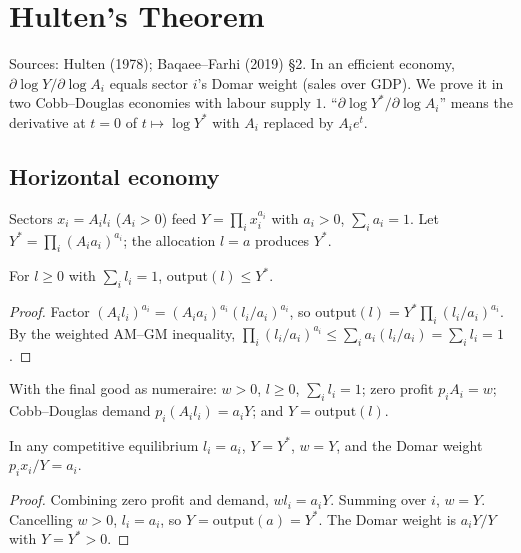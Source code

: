 \chapter{Hulten's Theorem}
\label{chap:hulten}

Sources: Hulten (1978); Baqaee--Farhi (2019) \S2. In an efficient economy,
$\partial \log Y / \partial \log A_i$ equals sector $i$'s Domar weight (sales over GDP). We prove it in two
Cobb--Douglas economies with labour supply $1$. ``$\partial \log Y^*/\partial \log A_i$'' means the derivative
at $t = 0$ of $t \mapsto \log Y^*$ with $A_i$ replaced by $A_i e^t$.

\section{Horizontal economy}
\label{sec:hulten_horizontal}

\begin{definition}
\label{def:hulten_horizontal}
\leanok
Sectors $x_i = A_i l_i$ ($A_i > 0$) feed $Y = \prod_i x_i^{a_i}$ with $a_i > 0$, $\sum_i a_i = 1$. Let
$Y^* = \prod_i (A_i a_i)^{a_i}$; the allocation $l = a$ produces $Y^*$.
\end{definition}

\begin{theorem}
\label{thm:hulten_h_output_le}
\leanok
{}
For $l \ge 0$ with $\sum_i l_i = 1$, $\mathrm{output}(l) \le Y^*$.
\end{theorem}
\begin{proof}
\leanok
Factor $(A_i l_i)^{a_i} = (A_i a_i)^{a_i} (l_i/a_i)^{a_i}$, so $\mathrm{output}(l) = Y^* \prod_i (l_i/a_i)^{a_i}$.
By the weighted AM--GM inequality, $\prod_i (l_i/a_i)^{a_i} \le \sum_i a_i (l_i/a_i) = \sum_i l_i = 1$.
\end{proof}

\begin{definition}
\label{def:hulten_h_ce}
\leanok
{}
With the final good as numeraire: $w > 0$, $l \ge 0$, $\sum_i l_i = 1$; zero profit $p_i A_i = w$; Cobb--Douglas
demand $p_i (A_i l_i) = a_i Y$; and $Y = \mathrm{output}(l)$.
\end{definition}

\begin{theorem}
\label{thm:hulten_h_ce_eq}
\leanok
{}
In any competitive equilibrium $l_i = a_i$, $Y = Y^*$, $w = Y$, and the Domar weight $p_i x_i / Y = a_i$.
\end{theorem}
\begin{proof}
\leanok
Combining zero profit and demand, $w l_i = a_i Y$. Summing over $i$, $w = Y$. Cancelling $w > 0$, $l_i = a_i$, so
$Y = \mathrm{output}(a) = Y^*$. The Domar weight is $a_i Y / Y$ with $Y = Y^* > 0$.
\end{proof}

